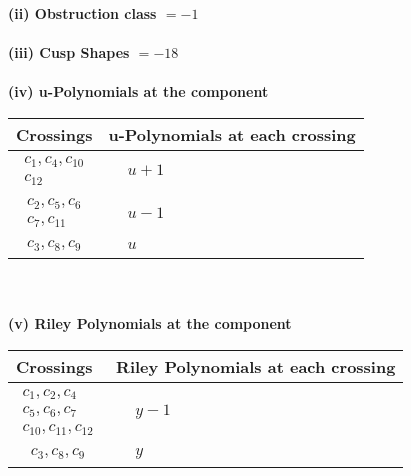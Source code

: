 \documentclass[1p]{elsarticle_modified}
\theoremstyle{definition}
\begin{document}
\flushleft \textbf{(ii) Obstruction class $= -1$}\\~\\
\flushleft \textbf{(iii) Cusp Shapes $= -18$}\\~\\
\newpage\renewcommand{\arraystretch}{1}
\flushleft \textbf{(iv) u-Polynomials at the component}\newline \\
\begin{tabular}{m{50pt}|m{274pt}}
Crossings & \hspace{64pt}u-Polynomials at each crossing \\
\hline $$\begin{aligned}c_{1},c_{4},c_{10}\\c_{12}\end{aligned}$$&$\begin{aligned}
&u+1
\end{aligned}$\\
\hline $$\begin{aligned}c_{2},c_{5},c_{6}\\c_{7},c_{11}\end{aligned}$$&$\begin{aligned}
&u-1
\end{aligned}$\\
\hline $$\begin{aligned}c_{3},c_{8},c_{9}\end{aligned}$$&$\begin{aligned}
&u
\end{aligned}$\\
\hline
\end{tabular}\\~\\
\newpage\renewcommand{\arraystretch}{1}
\flushleft \textbf{(v) Riley Polynomials at the component}\newline \\
\begin{tabular}{m{50pt}|m{274pt}}
Crossings & \hspace{64pt}Riley Polynomials at each crossing \\
\hline $$\begin{aligned}c_{1},c_{2},c_{4}\\c_{5},c_{6},c_{7}\\c_{10},c_{11},c_{12}\end{aligned}$$&$\begin{aligned}
&y-1
\end{aligned}$\\
\hline $$\begin{aligned}c_{3},c_{8},c_{9}\end{aligned}$$&$\begin{aligned}
&y
\end{aligned}$\\
\hline
\end{tabular}\\~\\
\end{document}
